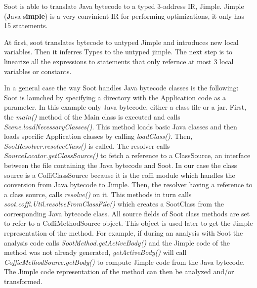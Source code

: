 \documentclass{dithesis}
\begin{document}
        Soot is able to translate Java bytecode to a typed 3-address IR, Jimple. Jimple (\textbf{J}ava s\textbf{imple}) is a very convinient IR for performing optimizations, it only has 15 statements.

        At first, soot translates bytecode to untyped Jimple and introduces new local variables. Then it inferres Types to the untyped jimple. The next step is to linearize all the expressions to statements that only refernce at most 3 local variables or constants. 
        
        In a general case the way Soot handles Java bytecode classes is the following: Soot is launched by specifying a directory with the Application code as a parameter. In this example only Java bytecode, either a class file or a jar. 
        First, the \textit{main()} method of the Main class is executed and calls \textit{Scene.loadNecessaryClasses()}. This method loads basic Java classes and then loads specific Application classes by calling \textit{loadClass()}. Then, \textit{SootResolver.resolveClass()} is called. The resolver calls \textit{SourceLocator.getClassSource()} to fetch a reference to a ClassSource, an interface between the file containing the Java bytecode and Soot. In our case the class source is a CoffiClassSource because it is the coffi module which handles the conversion from Java bytecode to Jimple. Then, the resolver having a reference to a class source, calls \textit{resolve()} on it. This methods in turn calls \textit{soot.coffi.Util.resolveFromClassFile()} which creates a SootClass from the corresponding Java bytecode class. All source fields of Soot class methods are set to refer to a CoffiMethodSource object. This object is used later to get the Jimple representation of the method. For example, if during an analysis with Soot the analysis code calls \textit{SootMethod.getActiveBody()} and the Jimple code of the method was not already generated, \textit{getActiveBody()} will call \textit{CofficMethodSource.getBody()} to compute Jimple code from the Java bytecode. The Jimple code representation of the method can then be analyzed and/or transformed.
\end{document}
